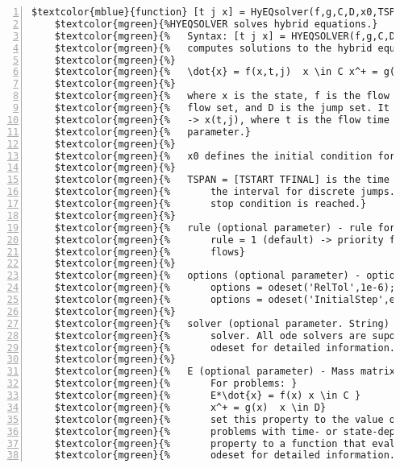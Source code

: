 \begin{Verbatim}[commandchars=\$\{\},numbers=left,numbersep=2pt]
    $textcolor{mblue}{function} [t j x] = HyEQsolver(f,g,C,D,x0,TSPAN,JSPAN,rule,options,solver,E) 
    $textcolor{mgreen}{%HYEQSOLVER solves hybrid equations.} 
    $textcolor{mgreen}{%   Syntax: [t j x] = HYEQSOLVER(f,g,C,D,x0,TSPAN,JSPAN,rule,options,solver,E)} 
    $textcolor{mgreen}{%   computes solutions to the hybrid equations} 
    $textcolor{mgreen}{%} 
    $textcolor{mgreen}{%   \dot{x} = f(x,t,j)  x \in C x^+ = g(x,t,j)  x \in D} 
    $textcolor{mgreen}{%} 
    $textcolor{mgreen}{%   where x is the state, f is the flow map, g is the jump map, C is the} 
    $textcolor{mgreen}{%   flow set, and D is the jump set. It outputs the state trajectory (t,j)} 
    $textcolor{mgreen}{%   -> x(t,j), where t is the flow time parameter and j is the jump} 
    $textcolor{mgreen}{%   parameter.} 
    $textcolor{mgreen}{%} 
    $textcolor{mgreen}{%   x0 defines the initial condition for the state.} 
    $textcolor{mgreen}{%} 
    $textcolor{mgreen}{%   TSPAN = [TSTART TFINAL] is the time interval. JSPAN = [JSTART JSTOP] is} 
    $textcolor{mgreen}{%       the interval for discrete jumps. The algorithm stop when the first} 
    $textcolor{mgreen}{%       stop condition is reached.} 
    $textcolor{mgreen}{%} 
    $textcolor{mgreen}{%   rule (optional parameter) - rule for jumps} 
    $textcolor{mgreen}{%       rule = 1 (default) -> priority for jumps rule = 2 -> priority for} 
    $textcolor{mgreen}{%       flows} 
    $textcolor{mgreen}{%} 
    $textcolor{mgreen}{%   options (optional parameter) - options for the solver see odeset f.ex.} 
    $textcolor{mgreen}{%       options = odeset('RelTol',1e-6);} 
    $textcolor{mgreen}{%       options = odeset('InitialStep',eps);} 
    $textcolor{mgreen}{%} 
    $textcolor{mgreen}{%   solver (optional parameter. String) - selection of the desired ode} 
    $textcolor{mgreen}{%       solver. All ode solvers are suported, exept for ode15i.  See help} 
    $textcolor{mgreen}{%       odeset for detailed information.} 
    $textcolor{mgreen}{%} 
    $textcolor{mgreen}{%   E (optional parameter) - Mass matrix [constant matrix | function_handle]} 
    $textcolor{mgreen}{%       For problems: } 
    $textcolor{mgreen}{%       E*\dot{x} = f(x) x \in C } 
    $textcolor{mgreen}{%       x^+ = g(x)  x \in D} 
    $textcolor{mgreen}{%       set this property to the value of the constant mass matrix. For} 
    $textcolor{mgreen}{%       problems with time- or state-dependent mass matrices, set this} 
    $textcolor{mgreen}{%       property to a function that evaluates the mass matrix. See help} 
    $textcolor{mgreen}{%       odeset for detailed information.} 

\end{Verbatim}
